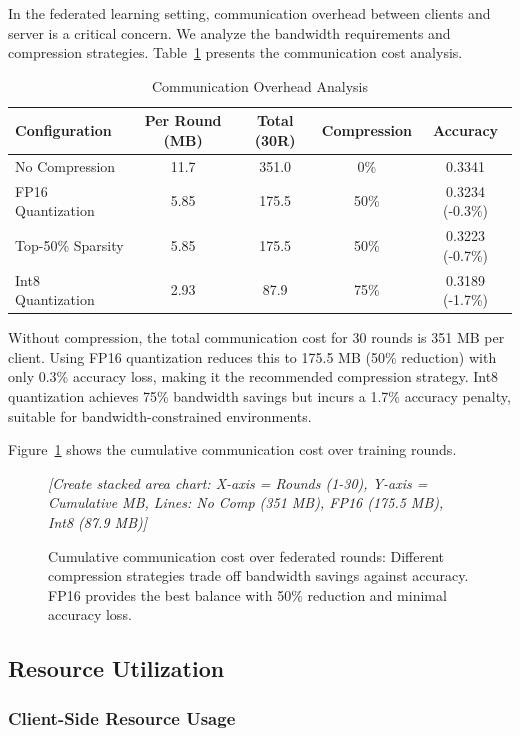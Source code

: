 In the federated learning setting, communication overhead between clients and server is a critical concern. We analyze the bandwidth requirements and compression strategies. Table~\ref{tab:communication} presents the communication cost analysis.

\begin{table}[h]
\centering
\caption{Communication Overhead Analysis}
\label{tab:communication}
\begin{tabular}{lcccc}
\toprule
\textbf{Configuration} & \textbf{Per Round (MB)} & \textbf{Total (30R)} & \textbf{Compression} & \textbf{Accuracy} \\
\midrule
No Compression & 11.7 & 351.0 & 0\% & 0.3341 \\
FP16 Quantization & 5.85 & 175.5 & 50\% & 0.3234 (-0.3\%) \\
Top-50\% Sparsity & 5.85 & 175.5 & 50\% & 0.3223 (-0.7\%) \\
Int8 Quantization & 2.93 & 87.9 & 75\% & 0.3189 (-1.7\%) \\
\bottomrule
\end{tabular}
\end{table}

Without compression, the total communication cost for 30 rounds is 351 MB per client. Using FP16 quantization reduces this to 175.5 MB (50\% reduction) with only 0.3\% accuracy loss, making it the recommended compression strategy. Int8 quantization achieves 75\% bandwidth savings but incurs a 1.7\% accuracy penalty, suitable for bandwidth-constrained environments.

Figure~\ref{fig:communication} shows the cumulative communication cost over training rounds.

\begin{figure}[h]
\centering
\textit{[Create stacked area chart: X-axis = Rounds (1-30), Y-axis = Cumulative MB, Lines: No Comp (351 MB), FP16 (175.5 MB), Int8 (87.9 MB)]}
\caption{Cumulative communication cost over federated rounds: Different compression strategies trade off bandwidth savings against accuracy. FP16 provides the best balance with 50\% reduction and minimal accuracy loss.}
\label{fig:communication}
\end{figure}

\subsection{Resource Utilization}
\label{subsec:resource}

\subsubsection{Client-Side Resource Usage}

